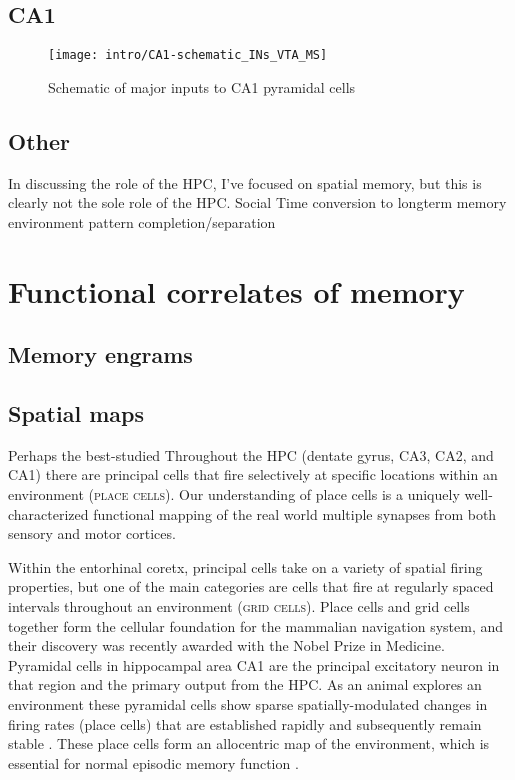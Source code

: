 \subsection{CA1}
\begin{figure}
	\centering
	\texttt{[image: intro/CA1-schematic\_INs\_VTA\_MS]}
	\caption{Schematic of major inputs to CA1 pyramidal cells}
	\label{fig:intro:memory:CA1_schematic}
\end{figure}


\subsection{Other}
In discussing the role of the \ac{HPC}, I've focused on spatial memory, but this is clearly not the sole role of the \ac{HPC}.
Social
Time
conversion to longterm memory
environment
pattern completion/separation

\section{Functional correlates of memory}\label{sec:intro:memory:physiology}

\subsection{Memory engrams}

\subsection{Spatial maps}
Perhaps the best-studied 
Throughout the \ac{HPC} (dentate gyrus, CA3, CA2, and CA1) there are principal cells that fire selectively at specific locations within an environment (\textsc{place cells}).
Our understanding of place cells is a uniquely well-characterized functional mapping of the real world multiple synapses from both sensory and motor cortices.

Within the entorhinal coretx, principal cells take on a variety of spatial firing properties, but one of the main categories are cells that fire at regularly spaced intervals throughout an environment (\textsc{grid cells}).
Place cells and grid cells together form the cellular foundation for the mammalian navigation system, and their discovery was recently awarded with the Nobel Prize in Medicine.
Pyramidal cells in hippocampal area CA1 are the principal excitatory neuron in that region and the primary output from the \ac{HPC}.
As an animal explores an environment these pyramidal cells show sparse spatially-modulated changes in firing rates (place cells) that are established rapidly and subsequently remain stable \citep{O'Keefe1971}\citep{Frank2004}.
These place cells form an allocentric map of the environment, which is essential for normal episodic memory function \citep{Smith2006c}\citep{Nakazawa2004}\citep{Buzsaki2013}.

